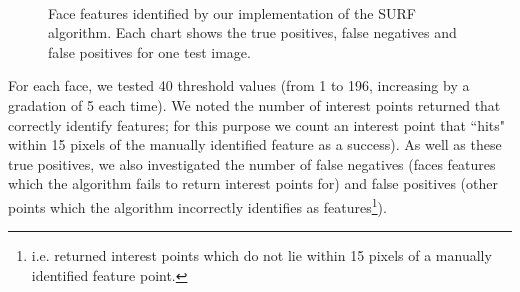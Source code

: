 \begin{figure} [h]
  \centering
  \\
  \caption[Face features identified by our SURF implementation (images 1 \& 2)]{Face features identified by our implementation of the SURF algorithm. Each chart shows the true positives, false negatives and false positives for one test image.}
  \label{fig:face-features-hits-1}
\end{figure}

For each face, we tested 40 threshold values (from 1 to 196, increasing by a gradation of 5 each time). We noted the number of interest points returned that correctly identify features; for this purpose we count an interest point that ``hits" within 15 pixels of the manually identified feature as a success). As well as these true positives, we also investigated the number of false negatives (faces features which the algorithm fails to return interest points for) and false positives (other points which the algorithm incorrectly identifies as features\footnote{i.e. returned interest points which do not lie within 15 pixels of a manually identified feature point.}).


